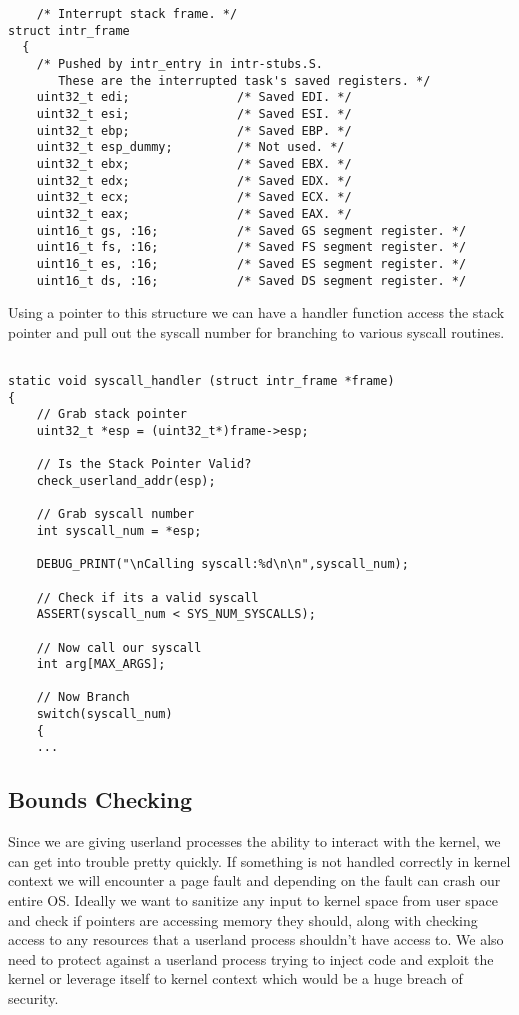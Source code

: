 \documentclass[]{article}
\begin{document}
    \lstset{language=C, tabsize=2}    
    \begin{lstlisting}
    /* Interrupt stack frame. */
struct intr_frame
  {
    /* Pushed by intr_entry in intr-stubs.S.
       These are the interrupted task's saved registers. */
    uint32_t edi;               /* Saved EDI. */
    uint32_t esi;               /* Saved ESI. */
    uint32_t ebp;               /* Saved EBP. */
    uint32_t esp_dummy;         /* Not used. */
    uint32_t ebx;               /* Saved EBX. */
    uint32_t edx;               /* Saved EDX. */
    uint32_t ecx;               /* Saved ECX. */
    uint32_t eax;               /* Saved EAX. */
    uint16_t gs, :16;           /* Saved GS segment register. */
    uint16_t fs, :16;           /* Saved FS segment register. */
    uint16_t es, :16;           /* Saved ES segment register. */
    uint16_t ds, :16;           /* Saved DS segment register. */
  \end{lstlisting}
  \newpage
  
  Using a pointer to this structure we can have a handler function access the stack pointer and pull out the syscall number for branching to various syscall routines. 
  
      \lstset{language=C, tabsize=2}    
    \begin{lstlisting}
  
static void syscall_handler (struct intr_frame *frame)
{
	// Grab stack pointer
	uint32_t *esp = (uint32_t*)frame->esp;

	// Is the Stack Pointer Valid?
	check_userland_addr(esp);
	
	// Grab syscall number
	int syscall_num = *esp;

	DEBUG_PRINT("\nCalling syscall:%d\n\n",syscall_num);

	// Check if its a valid syscall
	ASSERT(syscall_num < SYS_NUM_SYSCALLS);
	
	// Now call our syscall
	int arg[MAX_ARGS];
	
	// Now Branch
	switch(syscall_num)
	{
	...
\end{lstlisting}
\newpage
  
  \subsection{Bounds Checking}
  Since we are giving userland processes the ability to interact with the kernel, we can get into trouble pretty quickly. If something is not handled correctly in kernel context we will encounter a page fault and depending on the fault can crash our entire OS. Ideally we want to sanitize any input to kernel space from user space and check if pointers are accessing memory they should, along with checking access to any resources that a userland process shouldn't have access to. We also need to protect against a userland process trying to inject code and exploit the kernel or leverage itself to kernel context which would be a huge breach of security.
  
\end{document}
